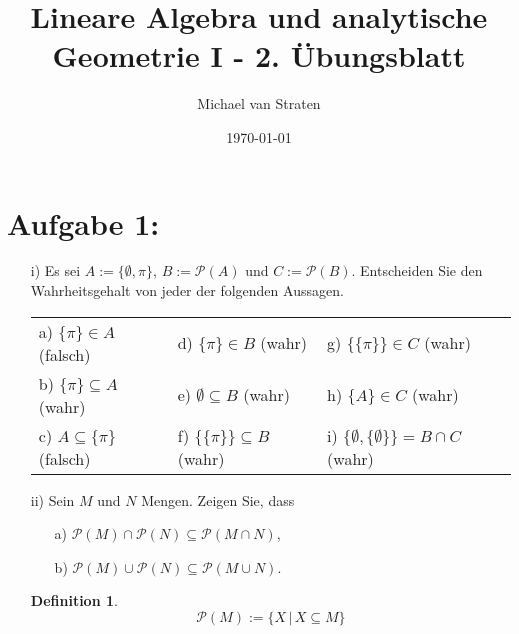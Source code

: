 \documentclass{exam}
\title{Lineare Algebra und analytische Geometrie I - 2. Übungsblatt}
\author{Michael van Straten}
\date{\today}
\newtheorem{definition}{Definition}
\begin{document}
\maketitle

\section*{Aufgabe 1:}
\begin{enumerate}
	\item [i)] Es sei $A := \{\emptyset, \pi\}$, $B := \mathcal{P}(A)$ und $C := \mathcal{P}(B)$. Entscheiden Sie den Wahrheitsgehalt von jeder der folgenden Aussagen. \newline
	      \renewcommand{\arraystretch}{1.5}
	      \begin{tabularx}{\textwidth}{ X X X }
		      a) $\{\pi\} \in A$ (falsch)       & d) $\{\pi\} \in B$ (wahr)           & g) $\{\{ \pi \}\} \in C$ (wahr)                     \\
		      b) $\{\pi\} \subseteq A$ (wahr)   & e) $\emptyset \subseteq B$ (wahr)   & h) $\{A\} \in C$ (wahr)                             \\
		      c) $A \subseteq \{\pi\}$ (falsch) & f) $\{\{\pi\}\} \subseteq B$ (wahr) & i) $\{\emptyset, \{\emptyset\}\} = B \cap C$ (wahr)
	      \end{tabularx}

	\item [ii)] Sein $M$ und $N$ Mengen. Zeigen Sie, dass \begin{enumerate}
		      \item [a)] $\mathcal{P}(M) \cap \mathcal{P}(N) \subseteq \mathcal{P}(M \cap N)$,
		      \item [b)] $\mathcal{P}(M) \cup \mathcal{P}(N) \subseteq \mathcal{P}(M \cup N)$.
	      \end{enumerate}
	      \begin{definition}
		      \begin{displaymath}
			      \mathcal{P}(M) := \{X\,|\,X \subseteq M\}
		      \end{displaymath}
	      \end{definition}


\end{enumerate}
\end{document}

